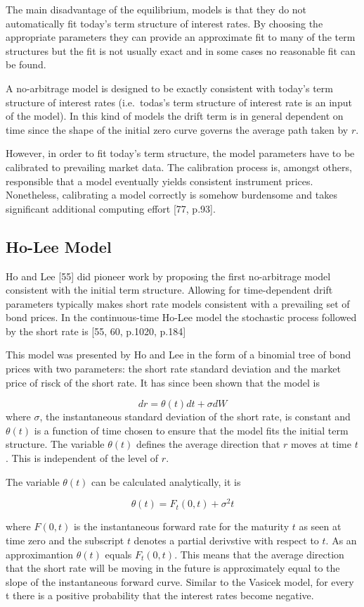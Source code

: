 The main disadvantage of the equilibrium, models is that they do not
automatically fit today's term structure of interest rates. By choosing
the appropriate parameters they can provide an approximate fit to many
of the term structures but the fit is not usually exact and in some
cases no reasonable fit can be found.

A no-arbitrage model is designed to be exactly consistent with today's
term structure of interest rates (i.e.~todas's term structure of
interest rate is an input of the model). In this kind of models the
drift term is in general dependent on time since the shape of the
initial zero curve governs the average path taken by \(r\).

However, in order to fit today’s term structure, the model parameters have
to be calibrated to prevailing market data. The calibration process is,
amongst others, responsible that a model eventually yields consistent
instrument prices. Nonetheless, calibrating a model correctly is somehow
burdensome and takes significant additional computing effort [77, p.93].


\subsection{Ho-Lee Model}\label{ho-lee-model}
Ho and Lee [55] did pioneer work by proposing the first no-arbitrage model consistent with the initial term structure. Allowing for time-dependent drift parameters typically makes short rate models consistent with a prevailing set of bond prices. In the continuous-time Ho-Lee model the stochastic process followed by the short rate is [55, 60, p.1020, p.184]

This model was presented by Ho and Lee in the form of a binomial tree of
bond prices with two parameters: the short rate standard deviation and
the market price of risck of the short rate. It has since been shown
that the model is

\[dr=\theta(t)dt +\sigma dW\]
where \(\sigma\), the instantaneous standard deviation of the short
rate, is constant and \(\theta(t)\) is a function of time chosen to
ensure that the model fits the initial term structure.
The variable
\(\theta(t)\) defines the average direction that \(r\) moves at time
\(t\). This is independent of the level of \(r\).

The variable \(\theta(t)\) can be calculated analytically, it is

\[\theta(t)=F_t(0, t) + \sigma^2 t\]

where \(F(0, t)\) is the instantaneous forward rate for the maturity
\(t\) as seen at time zero and the subscript \(t\) denotes a partial
derivstive with respect to \(t\). As an approximantion \(\theta(t)\)
equals \(F_t(0, t)\). This means that the average direction that the
short rate will be moving in the future is approximately equal to the
slope of the instantaneous forward curve.
Similar to the Vasicek model, for every t there is a positive probability that the interest rates become negative.

